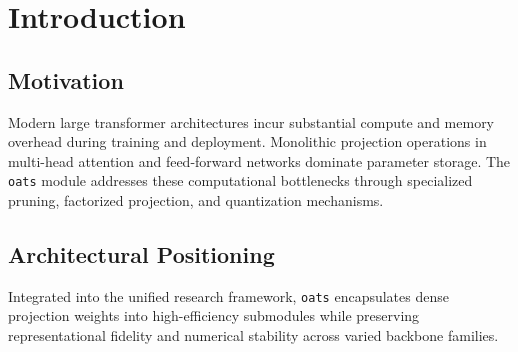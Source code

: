 \section{Introduction}

\subsection{Motivation}
Modern large transformer architectures incur substantial compute and memory overhead during training and deployment. Monolithic projection operations in multi-head attention and feed-forward networks dominate parameter storage. The \texttt{oats} module addresses these computational bottlenecks through specialized pruning, factorized projection, and quantization mechanisms.

\subsection{Architectural Positioning}
Integrated into the unified research framework, \texttt{oats} encapsulates dense projection weights into high-efficiency submodules while preserving representational fidelity and numerical stability across varied backbone families.
